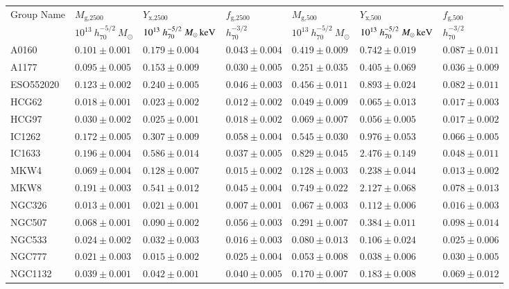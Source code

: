 \documentclass[structabstract]{aa}
\begin{document}
\begin{table}
\begin{threeparttable}
\begin{tabularx}{\textwidth}{lYYYYYY}
Group Name & $M_{\text{g,2500}}$ & $Y_{\text{x,2500}}$ & $f_{\text{g,2500}}$ & $M_{\text{g,500}}$ & $Y_{\text{x,500}}$ & $f_{\text{g,500}}$ \\ 
 & $10^{13}~h^{-5/2}_{70}~ M_{\odot}$ & $\unit[10^{13}~h^{-5/2}_{70}~ M_{\odot}]{keV}$ & $h^{-3/2}_{70}$ & $10^{13}~h^{-5/2}_{70}~ M_{\odot}$ & $\unit[10^{13}~h^{-5/2}_{70}~ M_{\odot}]{keV}$ & $h^{-3/2}_{70}$ \\ \hline
A0160 & $0.101\pm0.001$ & $0.179\pm0.004$ & $0.043\pm0.004$ & $0.419\pm0.009$ & $0.742\pm0.019$ & $0.087\pm0.011$ \\ 
A1177 & $0.095\pm0.005$ & $0.153\pm0.009$ & $0.030\pm0.005$ & $0.251\pm0.035$ & $0.405\pm0.069$ & $0.036\pm0.009$ \\ 
ESO552020 & $0.123\pm0.002$ & $0.240\pm0.005$ & $0.046\pm0.003$ & $0.456\pm0.011$ & $0.893\pm0.024$ & $0.082\pm0.011$ \\ 
HCG62 & $0.018\pm0.001$ & $0.023\pm0.002$ & $0.012\pm0.002$ & $0.049\pm0.009$ & $0.065\pm0.013$ & $0.017\pm0.003$ \\ 
HCG97 & $0.030\pm0.002$ & $0.025\pm0.001$ & $0.018\pm0.002$ & $0.069\pm0.007$ & $0.056\pm0.005$ & $0.017\pm0.002$ \\ 
IC1262 & $0.172\pm0.005$ & $0.307\pm0.009$ & $0.058\pm0.004$ & $0.545\pm0.030$ & $0.976\pm0.053$ & $0.066\pm0.005$ \\ 
IC1633 & $0.196\pm0.004$ & $0.586\pm0.014$ & $0.037\pm0.005$ & $0.829\pm0.045$ & $2.476\pm0.149$ & $0.048\pm0.011$ \\ 
MKW4 & $0.069\pm0.004$ & $0.128\pm0.007$ & $0.015\pm0.002$ & $0.128\pm0.003$ & $0.238\pm0.044$ & $0.013\pm0.002$ \\ 
MKW8 & $0.191\pm0.003$ & $0.541\pm0.012$ & $0.045\pm0.004$ & $0.749\pm0.022$ & $2.127\pm0.068$ & $0.078\pm0.013$ \\ 
NGC326 & $0.013\pm0.001$ & $0.021\pm0.001$ & $0.007\pm0.001$ & $0.067\pm0.003$ & $0.112\pm0.006$ & $0.016\pm0.003$ \\ 
NGC507 & $0.068\pm0.001$ & $0.090\pm0.002$ & $0.056\pm0.003$ & $0.291\pm0.007$ & $0.384\pm0.011$ & $0.098\pm0.014$ \\ 
NGC533 & $0.024\pm0.002$ & $0.032\pm0.003$ & $0.016\pm0.003$ & $0.080\pm0.013$ & $0.106\pm0.024$ & $0.025\pm0.006$ \\ 
NGC777 & $0.021\pm0.003$ & $0.015\pm0.002$ & $0.025\pm0.004$ & $0.053\pm0.008$ & $0.038\pm0.006$ & $0.030\pm0.005$ \\ 
NGC1132 & $0.039\pm0.001$ & $0.042\pm0.001$ & $0.040\pm0.005$ & $0.170\pm0.007$ & $0.183\pm0.008$ & $0.069\pm0.012$ \\ 

\end{tabularx}
\end{threeparttable}
\end{table}
\end{document}
